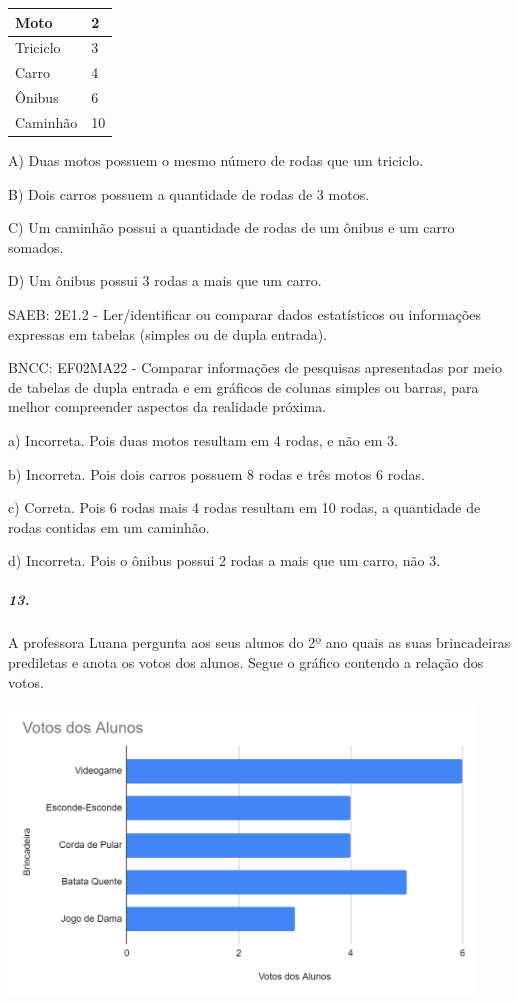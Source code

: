 \begin{longtable}[]{@{}ll@{}}
\toprule
Moto & 2\tabularnewline
\midrule
\endhead
Triciclo & 3\tabularnewline
Carro & 4\tabularnewline
Ônibus & 6\tabularnewline
Caminhão & 10\tabularnewline
\bottomrule
\end{longtable}

A) Duas motos possuem o mesmo número de rodas que um triciclo.

B) Dois carros possuem a quantidade de rodas de 3 motos.

C) Um caminhão possui a quantidade de rodas de um ônibus e um carro
somados.

D) Um ônibus possui 3 rodas a mais que um carro.

SAEB: 2E1.2 - Ler/identificar ou comparar dados estatísticos ou
informações expressas em tabelas (simples ou de dupla entrada).

BNCC: EF02MA22 - Comparar informações de pesquisas apresentadas por meio
de tabelas de dupla entrada e em gráficos de colunas simples ou barras,
para melhor compreender aspectos da realidade próxima.

a) Incorreta. Pois duas motos resultam em 4 rodas, e não em 3.

b) Incorreta. Pois dois carros possuem 8 rodas e três motos 6 rodas.

c) Correta. Pois 6 rodas mais 4 rodas resultam em 10 rodas, a quantidade
de rodas contidas em um caminhão.

d) Incorreta. Pois o ônibus possui 2 rodas a mais que um carro, não 3.

\subparagraph{13. }\label{section-157}

A professora Luana pergunta aos seus alunos do 2º ano quais as suas
brincadeiras prediletas e anota os votos dos alunos. Segue o gráfico
contendo a relação dos votos.

\includegraphics[width=4.88542in,height=3.01579in]{media/image171.png}

